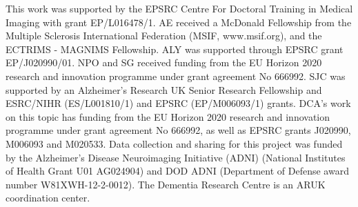 \documentclass{llncs}
\begin{document}
This work was supported by the EPSRC Centre For Doctoral Training in Medical Imaging with grant EP/L016478/1. AE received a McDonald Fellowship from the Multiple Sclerosis International Federation (MSIF, www.msif.org), and the ECTRIMS - MAGNIMS Fellowship. ALY was supported through EPSRC grant EP/J020990/01. NPO and SG received funding from the EU Horizon 2020 research and innovation programme under grant agreement No 666992. SJC was supported by an Alzheimer’s Research UK Senior Research Fellowship and ESRC/NIHR (ES/L001810/1) and EPSRC (EP/M006093/1) grants. DCA's work on this topic has funding from the EU Horizon 2020 research and innovation programme under grant agreement No 666992, as well as EPSRC grants J020990, M006093 and M020533. Data collection and sharing for this project was funded by the Alzheimer's Disease Neuroimaging Initiative (ADNI) (National Institutes of Health Grant U01 AG024904) and DOD ADNI (Department of Defense award number W81XWH-12-2-0012). The Dementia Research Centre is an ARUK coordination center.


%
\end{document}
